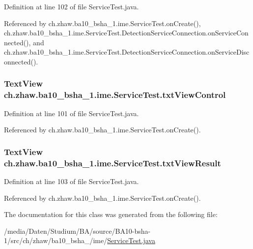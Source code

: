 Definition at line 102 of file ServiceTest.java.

Referenced by ch.zhaw.ba10\_\-bsha\_\-1.ime.ServiceTest.onCreate(), ch.zhaw.ba10\_\-bsha\_\-1.ime.ServiceTest.DetectionServiceConnection.onServiceConnected(), and ch.zhaw.ba10\_\-bsha\_\-1.ime.ServiceTest.DetectionServiceConnection.onServiceDisconnected().\hypertarget{classch_1_1zhaw_1_1ba10__bsha__1_1_1ime_1_1ServiceTest_a3eedc453bc997b1c3b6fed0a3c5cd0d5}{
\subsubsection[{txtViewControl}]{\setlength{\rightskip}{0pt plus 5cm}TextView {\bf ch.zhaw.ba10\_\-bsha\_\-1.ime.ServiceTest.txtViewControl}}}
\label{classch_1_1zhaw_1_1ba10__bsha__1_1_1ime_1_1ServiceTest_a3eedc453bc997b1c3b6fed0a3c5cd0d5}


Definition at line 101 of file ServiceTest.java.

Referenced by ch.zhaw.ba10\_\-bsha\_\-1.ime.ServiceTest.onCreate().\hypertarget{classch_1_1zhaw_1_1ba10__bsha__1_1_1ime_1_1ServiceTest_a9f9b094cd1d2a8d0f485a8e5f56da93c}{
\subsubsection[{txtViewResult}]{\setlength{\rightskip}{0pt plus 5cm}TextView {\bf ch.zhaw.ba10\_\-bsha\_\-1.ime.ServiceTest.txtViewResult}}}
\label{classch_1_1zhaw_1_1ba10__bsha__1_1_1ime_1_1ServiceTest_a9f9b094cd1d2a8d0f485a8e5f56da93c}


Definition at line 103 of file ServiceTest.java.

Referenced by ch.zhaw.ba10\_\-bsha\_\-1.ime.ServiceTest.onCreate().

The documentation for this class was generated from the following file:\begin{DoxyCompactItemize}
\item 
/media/Daten/Studium/BA/source/BA10-\/bsha-\/1/src/ch/zhaw/ba10\_\-bsha\_/ime/\hyperlink{ServiceTest_8java}{ServiceTest.java}\end{DoxyCompactItemize}
